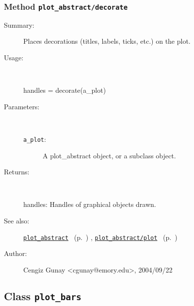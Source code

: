 \subsubsection[Method \texttt{decorate}]{Method \texttt{plot\_abstract/decorate}}%
%
\label{ref_plot_abstract__decorate}%
\hypertarget{ref_plot_abstract__decorate}{}%
\begin{description}
\item[Summary:]Places decorations (titles, labels, ticks, etc.) on the plot.
%
\item[Usage:]~%
\begin{lyxcode}%
handles = decorate(a\_plot)
%
\end{lyxcode}%
%
%
\item[Parameters:]~
\begin{description}%
\item[\texttt{a\_plot}:]
 A plot\_abstract object, or a subclass object.
\end{description}%
%
\item[Returns:]~

	handles: Handles of graphical objects drawn.
%
%
\item[See also:]%
\hyperlink{ref_plot_abstract}{\texttt{plot\_abstract}}%
\ (p.~\pageref{ref_plot_abstract})%
%
, \hyperlink{ref_plot_abstract__plot}{\texttt{plot\_abstract/plot}}%
\ (p.~\pageref{ref_plot_abstract__plot})%
%
%
\item[Author:]%
Cengiz Gunay <cgunay@emory.edu>, 2004/09/22%
\end{description}
\methodline%
\subsection{Class \texttt{plot\_bars}}%
%
\label{ref_plot_bars}%
\hypertarget{ref_plot_bars}{}%
